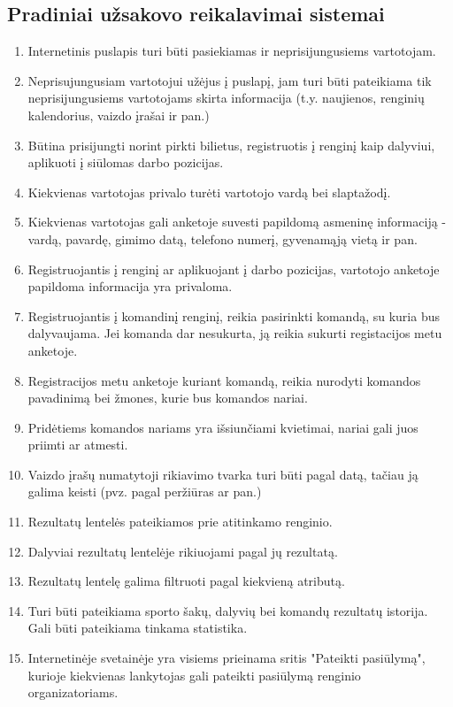 \documentclass{VUMIFPSkursinis}
\begin{document}
        \subsection{Pradiniai užsakovo reikalavimai sistemai}
		\begin{enumerate}
			\item Internetinis puslapis turi būti pasiekiamas ir neprisijungusiems vartotojam.
			\item Neprisujungusiam vartotojui užėjus į puslapį, jam turi būti pateikiama tik neprisijungusiems vartotojams skirta informacija (t.y. naujienos, renginių kalendorius, vaizdo įrašai ir pan.)
			\item Būtina prisijungti norint pirkti bilietus, registruotis į renginį kaip dalyviui, aplikuoti į siūlomas darbo pozicijas.
			\item Kiekvienas vartotojas privalo turėti vartotojo vardą bei slaptažodį.
			\item Kiekvienas vartotojas gali anketoje suvesti papildomą asmeninę informaciją - vardą, pavardę, gimimo datą, telefono numerį, gyvenamąją vietą ir pan.
			\item Registruojantis į renginį ar aplikuojant į darbo pozicijas, vartotojo anketoje papildoma informacija yra privaloma.
			\item Registruojantis į komandinį renginį, reikia pasirinkti komandą, su kuria bus dalyvaujama. Jei komanda dar nesukurta, ją reikia sukurti registacijos metu anketoje.
			\item Registracijos metu anketoje kuriant komandą, reikia nurodyti komandos pavadinimą bei žmones, kurie bus komandos nariai.
			\item Pridėtiems komandos nariams yra išsiunčiami kvietimai, nariai gali juos priimti ar atmesti.
			\item Vaizdo įrašų numatytoji rikiavimo tvarka turi būti pagal datą, tačiau ją galima keisti (pvz. pagal peržiūras ar pan.)
			\item Rezultatų lentelės pateikiamos prie atitinkamo renginio.
			\item Dalyviai rezultatų lentelėje rikiuojami pagal jų rezultatą.
			\item Rezultatų lentelę galima filtruoti pagal kiekvieną atributą.
			\item Turi būti pateikiama sporto šakų, dalyvių bei komandų rezultatų istorija. Gali būti pateikiama tinkama statistika.
			\item Internetinėje svetainėje yra visiems prieinama sritis "Pateikti pasiūlymą", kurioje kiekvienas lankytojas gali pateikti pasiūlymą renginio organizatoriams.

\end{enumerate}
\end{document}
